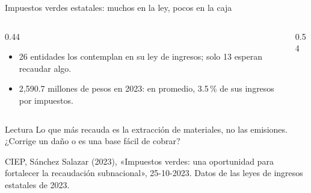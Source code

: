 \documentclass[aspectratio=169,11pt]{beamer}
\newcommand{\fuente}[1]{\par\vfill{\small\color{cGris}#1\par}}
\begin{document}
\begin{frame}{Impuestos verdes estatales: muchos en la ley, pocos en la caja}
  \begin{columns}[T]
    \begin{column}{0.44\textwidth}
      \begin{itemize}
        \item 26 entidades los contemplan en su ley de ingresos; solo 13 esperan recaudar algo.
        \item 2,590.7 millones de pesos en 2023: en promedio, 3.5\,\% de sus ingresos por impuestos.
      \end{itemize}
    \end{column}
    \begin{column}{0.54\textwidth}
      \centering
    \end{column}
  \end{columns}
  \pause
  \begin{block}{Lectura}
    Lo que más recauda es la extracción de materiales, no las emisiones. ¿Corrige un daño o es una base fácil de cobrar?
  \end{block}
  \fuente{CIEP, Sánchez Salazar (2023), «Impuestos verdes: una oportunidad para fortalecer la recaudación subnacional», 25-10-2023. Datos de las leyes de ingresos estatales de 2023.}
\end{frame}
\end{document}
